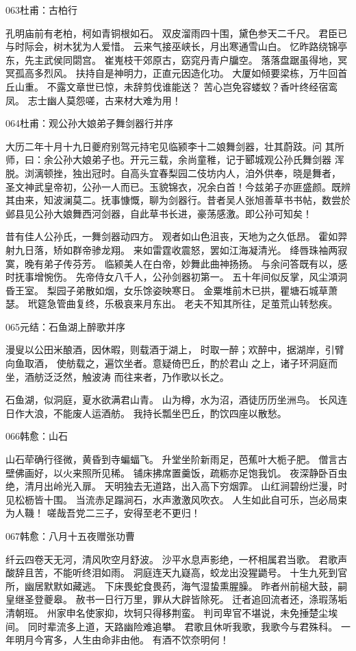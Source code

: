 063杜甫：古柏行

孔明庙前有老柏，柯如青铜根如石。
双皮溜雨四十围，黛色参天二千尺。
君臣已与时际会，树木犹为人爱惜。
云来气接巫峡长，月出寒通雪山白。
忆昨路绕锦亭东，先主武侯同閟宫。
崔嵬枝干郊原古，窈窕丹青户牖空。
落落盘踞虽得地，冥冥孤高多烈风。
扶持自是神明力，正直元因造化功。
大厦如倾要梁栋，万牛回首丘山重。
不露文章世已惊，未辞剪伐谁能送？
苦心岂免容蝼蚁？香叶终经宿鸾凤。
志士幽人莫怨嗟，古来材大难为用！

064杜甫：观公孙大娘弟子舞剑器行并序

大历二年十月十九日夔府别驾元持宅见临颍李十二娘舞剑器，壮其蔚跂。问
其所师，曰：余公孙大娘弟子也。开元三载，余尚童稚，记于郾城观公孙氏舞剑器
浑脱。浏漓顿挫，独出冠时。自高头宜春梨园二伎坊内人，洎外供奉，晓是舞者，
圣文神武皇帝初，公孙一人而已。玉貌锦衣，况余白首！今兹弟子亦匪盛颜。既辨
其由来，知波澜莫二。抚事慷慨，聊为剑器行。昔者吴人张旭善草书书帖，数尝於
邺县见公孙大娘舞西河剑器，自此草书长进，豪荡感激。即公孙可知矣！

昔有佳人公孙氏，一舞剑器动四方。
观者如山色沮丧，天地为之久低昂。
霍如羿射九日落，矫如群帝骖龙翔。
来如雷霆收震怒，罢如江海凝清光。
绛唇珠袖两寂寞，晚有弟子传芬芳。
临颍美人在白帝，妙舞此曲神扬扬。
与余问答既有以，感时抚事增惋伤。
先帝侍女八千人，公孙剑器初第一。
五十年间似反掌，风尘澒洞昏王室。
梨园子弟散如烟，女乐馀姿映寒日。
金粟堆前木已拱，瞿塘石城草萧瑟。
玳筵急管曲复终，乐极哀来月东出。
老夫不知其所往，足茧荒山转愁疾。

065元结：石鱼湖上醉歌并序

漫叟以公田米酿酒，因休暇，则载酒于湖上，
时取一醉；欢醉中，据湖岸，引臂向鱼取酒，
使舫载之，遍饮坐者。意疑倚巴丘，酌於君山
之上，诸子环洞庭而坐，酒舫泛泛然，触波涛
而往来者，乃作歌以长之。

石鱼湖，似洞庭，夏水欲满君山青。
山为樽，水为沼，酒徒历历坐洲鸟。
长风连日作大浪，不能废人运酒舫。
我持长瓢坐巴丘，酌饮四座以散愁。

066韩愈：山石

山石荦确行径微，黄昏到寺蝙蝠飞。
升堂坐阶新雨足，芭蕉叶大栀子肥。
僧言古壁佛画好，以火来照所见稀。
铺床拂席置羹饭，疏粝亦足饱我饥。
夜深静卧百虫绝，清月出岭光入扉。
天明独去无道路，出入高下穷烟霏。
山红涧碧纷烂漫，时见松枥皆十围。
当流赤足蹋涧石，水声激激风吹衣。
人生如此自可乐，岂必局束为人鞿！
嗟哉吾党二三子，安得至老不更归！

067韩愈：八月十五夜赠张功曹

纤云四卷天无河，清风吹空月舒波。
沙平水息声影绝，一杯相属君当歌。
君歌声酸辞且苦，不能听终泪如雨。
洞庭连天九嶷高，蛟龙出没猩鼯号。
十生九死到官所，幽居默默如藏逃。
下床畏蛇食畏药，海气湿蛰熏腥臊。
昨者州前槌大鼓，嗣皇继圣登夔皋。
赦书一日行万里，罪从大辟皆除死。
迁者追回流者还，涤瑕荡垢清朝班。
州家申名使家抑，坎轲只得移荆蛮。
判司卑官不堪说，未免捶楚尘埃间。
同时辈流多上道，天路幽险难追攀。
君歌且休听我歌，我歌今与君殊科。
一年明月今宵多，人生由命非由他。
有酒不饮奈明何！

